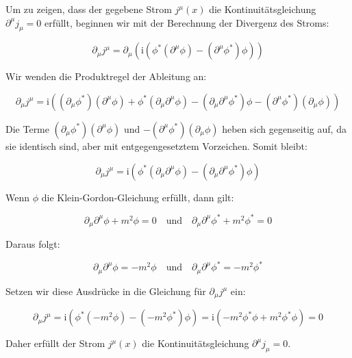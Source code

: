 Um zu zeigen, dass der gegebene Strom \( j^\mu(x) \) die Kontinuitätsgleichung \(\partial^\mu j_\mu = 0\) erfüllt, beginnen wir mit der Berechnung der Divergenz des Stroms:

\[
\partial_\mu j^\mu = \partial_\mu \left( \mathrm{i} \left( \phi^* \left( \partial^\mu \phi \right) - \left( \partial^\mu \phi^* \right) \phi \right) \right)
\]

Wir wenden die Produktregel der Ableitung an:

\[
\partial_\mu j^\mu = \mathrm{i} \left( \left( \partial_\mu \phi^* \right) \left( \partial^\mu \phi \right) + \phi^* \left( \partial_\mu \partial^\mu \phi \right) - \left( \partial_\mu \partial^\mu \phi^* \right) \phi - \left( \partial^\mu \phi^* \right) \left( \partial_\mu \phi \right) \right)
\]

Die Terme \(\left( \partial_\mu \phi^* \right) \left( \partial^\mu \phi \right)\) und \(- \left( \partial^\mu \phi^* \right) \left( \partial_\mu \phi \right)\) heben sich gegenseitig auf, da sie identisch sind, aber mit entgegengesetztem Vorzeichen. Somit bleibt:

\[
\partial_\mu j^\mu = \mathrm{i} \left( \phi^* \left( \partial_\mu \partial^\mu \phi \right) - \left( \partial_\mu \partial^\mu \phi^* \right) \phi \right)
\]

Wenn \(\phi\) die Klein-Gordon-Gleichung erfüllt, dann gilt:

\[
\partial_\mu \partial^\mu \phi + m^2 \phi = 0 \quad \text{und} \quad \partial_\mu \partial^\mu \phi^* + m^2 \phi^* = 0
\]

Daraus folgt:

\[
\partial_\mu \partial^\mu \phi = -m^2 \phi \quad \text{und} \quad \partial_\mu \partial^\mu \phi^* = -m^2 \phi^*
\]

Setzen wir diese Ausdrücke in die Gleichung für \(\partial_\mu j^\mu\) ein:

\[
\partial_\mu j^\mu = \mathrm{i} \left( \phi^* (-m^2 \phi) - (-m^2 \phi^*) \phi \right) = \mathrm{i} \left( -m^2 \phi^* \phi + m^2 \phi^* \phi \right) = 0
\]

Daher erfüllt der Strom \( j^\mu(x) \) die Kontinuitätsgleichung \(\partial^\mu j_\mu = 0\).